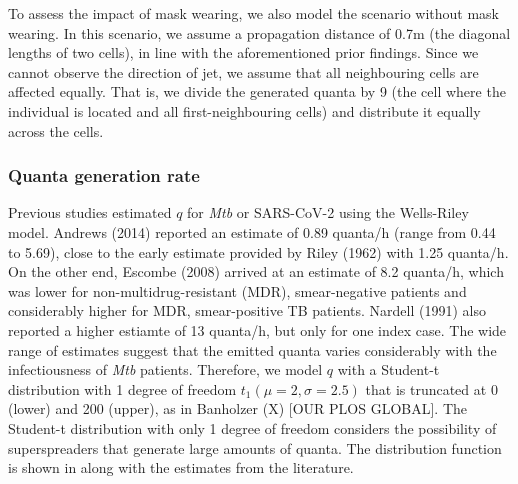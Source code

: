 \documentclass[fleqn,11pt]{wlscirep_supp}
\begin{document}
To assess the impact of mask wearing, we also model the scenario without mask wearing. In this scenario, we assume a propagation distance of 0.7m (the diagonal lengths of two cells), in line with the aforementioned prior findings. Since we cannot observe the direction of jet, we assume that all neighbouring cells are affected equally. That is, we divide the generated quanta by 9 (the cell where the individual is located and all first-neighbouring cells) and distribute it equally across the cells. 


\subsubsection{Quanta generation rate}


Previous studies estimated $q$ for \emph{Mtb} or SARS-CoV-2 using the Wells-Riley model\cite{Andrews2014JID,Riley1962ARRD,Escombe2008PLoSMed,Nardell1991ARRD}. Andrews (2014)\cite{Andrews2014JID} reported an estimate of 0.89 quanta/h (range from 0.44 to 5.69), close to the early estimate provided by Riley (1962)\cite{Riley1962ARRD} with 1.25 quanta/h. On the other end, Escombe (2008)\cite{Escombe2008PLoSMed} arrived at an estimate of 8.2 quanta/h, which was lower for non-multidrug-resistant (MDR), smear-negative patients and considerably higher for MDR, smear-positive TB patients. Nardell (1991)\cite{Nardell1991ARRD} also reported a higher estiamte of 13 quanta/h, but only for one index case. The wide range of estimates suggest that the emitted quanta varies considerably with the infectiousness of \emph{Mtb} patients\cite{Wurie2016BMJ}. Therefore, we model $q$ with a Student-t distribution with 1 degree of freedom $t_1(\mu = 2, \sigma = 2.5)$ that is truncated at 0 (lower) and 200 (upper), as in Banholzer (X) [OUR PLOS GLOBAL]. The Student-t distribution with only 1 degree of freedom considers the possibility of superspreaders that generate large amounts of quanta. The distribution function is shown in  along with the estimates from the literature.
\end{document}
